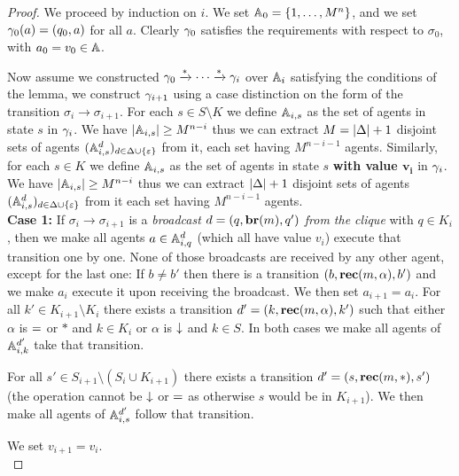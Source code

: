 \begin{proof}
	
	We proceed by induction on $i$.
	We set $\mathbb{A}_0 = \{1, \ldots, M^n\}$, and we set $\gamma_0(a) = (q_0, a)$ for all $a$. Clearly $\gamma_0$ satisfies the requirements with respect to $\sigma_0$, with $a_0 = v_0 \in \mathbb{A}$.
	
	Now assume we constructed $\gamma_0 \xrightarrow{*} \cdots \xrightarrow{*} \gamma_{i}$ over $\mathbb{A}_i$ satisfying the conditions of the lemma, we construct $\gamma_{i+1}$ using a case distinction on the form of the transition $\sigma_i \to \sigma_{i+1}$.
	For each $s \in S\setminus K$ we define $\mathbb{A}_{i,s}$ as the set of agents in state $s$ in $\gamma_{i}$. We have $|\mathbb{A}_{i,s}| \geq M^{n-i}$ thus we can extract $M = |\Delta|+1$ disjoint sets of agents $(\mathbb{A}_{i,s}^d)_{d \in \Delta\cup\{\varepsilon\}}$ from it, each set having $M^{n-i-1}$ agents.
	Similarly, for each $s \in K$ we define $\mathbb{A}_{i,s}$ as the set of agents in state $s$ \textbf{with value $\mathbf{v_i}$} in $\gamma_{i}$. We have $|\mathbb{A}_{i,s}| \geq M^{n-i}$ thus we can extract $|\Delta|+1$ disjoint sets of agents $(\mathbb{A}_{i,s}^d)_{d \in \Delta\cup\{\varepsilon\}}$ from it each set having $M^{n-i-1}$ agents.
	\\
	
	\textbf{Case 1: } If $\sigma_i \to \sigma_{i+1}$ is a \emph{broadcast $d = (q, \textbf{br}(m), q')$ from the clique} with $q \in K_i$, then we make all agents $a \in \mathbb{A}_{i,q}^{d}$ (which all have value $v_i$) execute that transition one by one.
	None of those broadcasts are received by any other agent, except for the last one:
	If $b \neq b'$ then there is a transition $(b, \textbf{rec}(m, \alpha), b')$ and we make $a_i$ execute it upon receiving the broadcast. We then set $a_{i+1} = a_i$.
	For all $k' \in K_{i+1} \setminus K_i$ there exists a transition $d'=(k, \textbf{rec}(m, \alpha), k')$ such that either $\alpha$ is ${=}$ or $*$ and $k \in K_i$ or $\alpha$ is $\downarrow$ and $k\in S$.
	In both cases we make all agents of $\mathbb{A}_{i,k}^{d'}$ take that transition.
	
	For all $s' \in S_{i+1} \setminus (S_i \cup K_{i+1})$ there exists a transition $d'=(s,\textbf{rec}(m, *),s')$ (the operation cannot be $\downarrow$ or ${=}$ as otherwise $s$ would be in $K_{i+1}$). We then make all agents of $\mathbb{A}_{i,s}^{d'}$ follow that transition. 
	
	We set $v_{i+1} = v_i$.
	\\
	

\end{proof}
